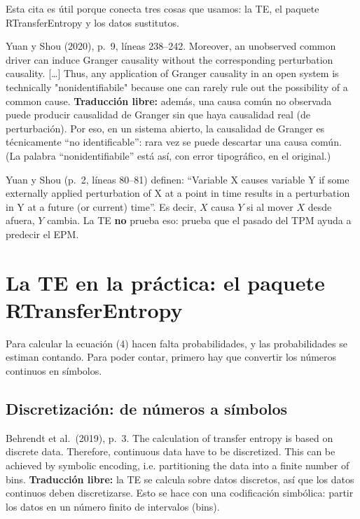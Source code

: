 \documentclass[11pt,openany]{book}
\begin{document}
Esta cita es útil porque conecta tres cosas que usamos: la TE, el paquete RTransferEntropy y los datos sustitutos.

\begin{cita}{Yuan y Shou (2020), p.~9, líneas 238--242.}
Moreover, an unobserved common driver can induce Granger causality without the corresponding perturbation causality. [\dots] Thus, any application of Granger causality in an open system is technically "nonidentifiabile" because one can rarely rule out the possibility of a common cause.
\tcblower
\textbf{Traducción libre:} además, una causa común no observada puede producir causalidad de Granger sin que haya causalidad real (de perturbación). Por eso, en un sistema abierto, la causalidad de Granger es técnicamente ``no identificable'': rara vez se puede descartar una causa común. (La palabra ``nonidentifiabile'' está así, con error tipográfico, en el original.)
\end{cita}

\begin{nota}
Yuan y Shou (p.~2, líneas 80--81) definen: ``Variable X causes variable Y if some externally applied perturbation of X at a point in time results in a perturbation in Y at a future (or current) time''. Es decir, $X$ causa $Y$ si al mover $X$ desde afuera, $Y$ cambia. La TE \textbf{no} prueba eso: prueba que el pasado del TPM ayuda a predecir el EPM.
\end{nota}

\chapter{La TE en la práctica: el paquete RTransferEntropy}\label{cap:te-practica}

Para calcular la ecuación (4) hacen falta probabilidades, y las probabilidades se estiman contando. Para poder contar, primero hay que convertir los números continuos en símbolos.

\section{Discretización: de números a símbolos}

\begin{cita}{Behrendt et al.\ (2019), p.~3.}
The calculation of transfer entropy is based on discrete data. Therefore, continuous data have to be discretized. This can be achieved by symbolic encoding, i.e. partitioning the data into a finite number of bins.
\tcblower
\textbf{Traducción libre:} la TE se calcula sobre datos discretos, así que los datos continuos deben discretizarse. Esto se hace con una codificación simbólica: partir los datos en un número finito de intervalos (bins).
\end{cita}
\end{document}
